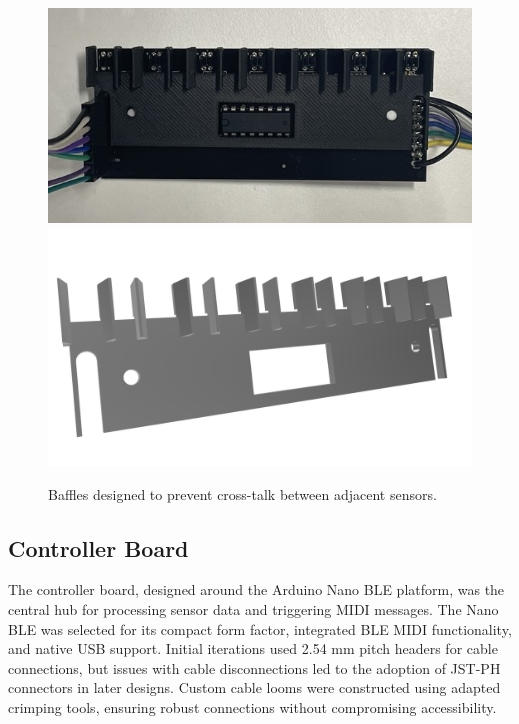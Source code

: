 \begin{figure}
    \centering
    \includegraphics[width=\linewidth]{src/images/sensor-board-w-baffles.jpeg}
    \\
    \includegraphics[width=\linewidth]{src/images/baffles.png}
    \caption{Baffles designed to prevent cross-talk between adjacent sensors.}
    \Description{}
    \label{fig:baffles}
\end{figure}
\subsection{Controller Board}\label{controller-board}

The controller board, designed around the Arduino Nano BLE platform, was the central hub for processing sensor data and triggering MIDI messages. The Nano BLE was selected for its compact form factor, integrated BLE MIDI functionality, and native USB support.  Initial iterations used 2.54 mm pitch headers for cable connections, but issues with cable disconnections led to the adoption of JST-PH connectors in later designs. Custom cable looms were constructed using adapted crimping tools, ensuring robust connections without compromising accessibility.

